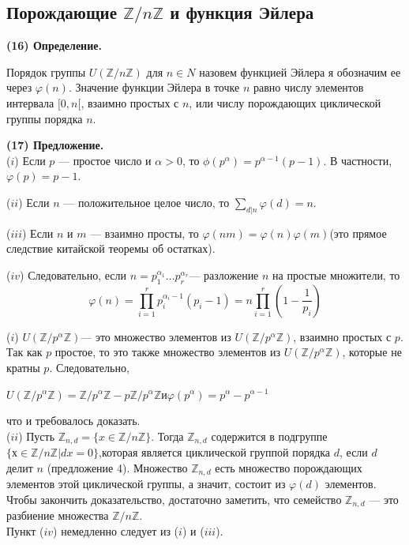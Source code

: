 \subsection{Порождающие $\mathbb{Z}/n\mathbb{Z}$ и функция Эйлера}
\vspace{4pt}\textbf{(16) Определение.} 
\par
Порядок группы $U(\mathbb{Z}/n\mathbb{Z})$ для $n \in N$ назовем функцией Эйлера я обозначим ее через $\varphi(n)$. Значение функции Эйлера в точке $n$ равно числу элементов интервала $[0, n[$, взаимно простых с $n$, или числу порождающих циклической группы порядка $n$.
\pagebreak
\newpage

\textbf{(17) Предложение.} \\
($i$) Если $p$ --- простое число и $\alpha > 0$, то $\phi(p^{\alpha}) = p^{\alpha - 1}(p - 1)$. В частности, $\varphi(p) = p - 1$. \par
($ii$) Если $n$ --- положительное целое число, то $\sum_{d|n}\varphi(d) = n$. \par
($iii$) Если $n$ и $m$ --- взаимно просты, то $\varphi(nm) = \varphi(n)\varphi(m)$(это прямое следствие китайской теоремы об остатках).\par  
($iv$) Следовательно, если $n = p_1^{\alpha_1} \ldots p_r^{\alpha_r}$--- разложение $n$ на простые множители, то
$$\varphi(n) = \prod\limits_{i = 1}^{r}p_{i}^{\alpha_{i}-1}(p_{i} - 1) = n\prod\limits_{i = 1}^{r}(1 - \frac{1}{p_i})$$
\begin{myproof}
($i$) $U(\mathbb{Z}/p^{\alpha}\mathbb{Z})$--- это множество элементов из $U(\mathbb{Z}/p^{\alpha}\mathbb{Z})$, взаимно простых с $p$. Так как $p$ простое, то это также множество элементов из $U(\mathbb{Z}/p^{\alpha}\mathbb{Z})$, которые не кратны $p$. Следовательно,
\begin{center}
$U(\mathbb{Z}/p^{\alpha}\mathbb{Z}) =\mathbb{Z}/p^{\alpha}\mathbb{Z} - p\mathbb{Z}/p^{\alpha}\mathbb{Z}$\enskip и\enskip $\varphi(p^{\alpha}) = p^{\alpha} - p^{\alpha - 1}$
\end{center}
что и требовалось доказать.  \\
($ii$) Пусть $\mathbb{Z}_{n,d} = \{x \in \mathbb{Z}/n\mathbb{Z} \}$. Тогда $\mathbb{Z}_{n,d}$ содержится в подгруппе $\{ х \in \mathbb{Z}/n\mathbb{Z} | dx = 0 \}$,которая является циклической группой порядка $d$, если $d$ делит $n$ (предложение 4). Множество  $\mathbb{Z}_{n,d}$ есть множество порождающих элементов этой циклической группы, а значит, состоит из $\varphi (d)$ элементов. Чтобы закончить доказательство, достаточно заметить, что семейство $\mathbb{Z}_{n,d}$ --- это разбиение множества $\mathbb{Z}/n\mathbb{Z}$. \\
Пункт ($iv$) немедленно следует из ($i$) и ($iii$).
\end{myproof}
